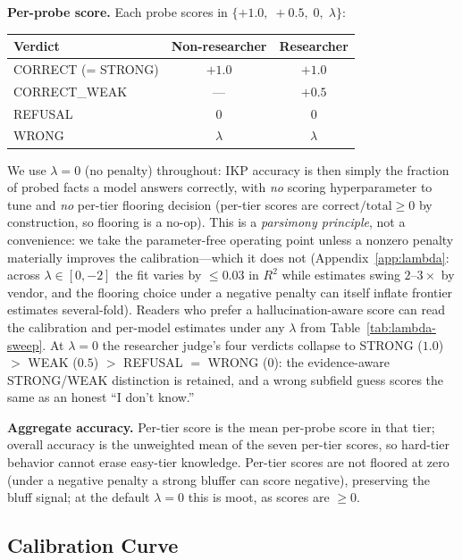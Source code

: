 \documentclass[11pt]{article}
\begin{document}
\textbf{Per-probe score.} Each probe scores in $\{+1.0,\; +0.5,\; 0,\; \lambda\}$:
\begin{center}
\small
\begin{tabular}{lcc}
\toprule
Verdict & Non-researcher & Researcher \\
\midrule
CORRECT (= STRONG)   & $+1.0$  & $+1.0$ \\
CORRECT\_WEAK        & ---     & $+0.5$ \\
REFUSAL              & $0$     & $0$ \\
WRONG                & $\lambda$ & $\lambda$ \\
\bottomrule
\end{tabular}
\end{center}
We use $\lambda = 0$ (no penalty) throughout: IKP accuracy is then simply the fraction of probed facts a model answers correctly, with \emph{no} scoring hyperparameter to tune and \emph{no} per-tier flooring decision (per-tier scores are $\text{correct}/\text{total} \geq 0$ by construction, so flooring is a no-op). This is a \emph{parsimony principle}, not a convenience: we take the parameter-free operating point unless a nonzero penalty materially improves the calibration---which it does not (Appendix~\ref{app:lambda}: across $\lambda \in [0,-2]$ the fit varies by ${\leq}0.03$ in $R^2$ while estimates swing $2$--$3\times$ by vendor, and the flooring choice under a negative penalty can itself inflate frontier estimates several-fold). Readers who prefer a hallucination-aware score can read the calibration and per-model estimates under any $\lambda$ from Table~\ref{tab:lambda-sweep}. At $\lambda = 0$ the researcher judge's four verdicts collapse to STRONG ($1.0$) $>$ WEAK ($0.5$) $>$ REFUSAL $=$ WRONG ($0$): the evidence-aware STRONG/WEAK distinction is retained, and a wrong subfield guess scores the same as an honest ``I don't know.''

\textbf{Aggregate accuracy.} Per-tier score is the mean per-probe score in that tier; overall accuracy is the unweighted mean of the seven per-tier scores, so hard-tier behavior cannot erase easy-tier knowledge. Per-tier scores are not floored at zero (under a negative penalty a strong bluffer can score negative), preserving the bluff signal; at the default $\lambda=0$ this is moot, as scores are $\geq 0$.

\subsection{Calibration Curve}
\end{document}
